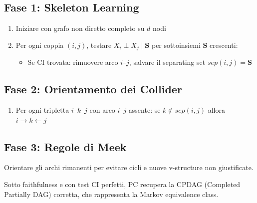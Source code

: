 \subsection{Fase 1: Skeleton Learning}
\begin{enumerate}
    \item Iniziare con grafo non diretto completo su $d$ nodi
    \item Per ogni coppia $(i,j)$, testare $X_i \perp X_j \mid \mathbf{S}$ per sottoinsiemi $\mathbf{S}$ crescenti:
    \begin{itemize}
        \item Se CI trovata: rimuovere arco $i$--$j$, salvare il separating set $sep(i,j) = \mathbf{S}$
    \end{itemize}
\end{enumerate}
\subsection{Fase 2: Orientamento dei Collider}
\begin{enumerate}
    \item Per ogni tripletta $i$--$k$--$j$ con arco $i$--$j$ assente: se $k \notin sep(i,j)$ allora $i \to k \leftarrow j$
\end{enumerate}
\subsection{Fase 3: Regole di Meek}
Orientare gli archi rimanenti per evitare cicli e nuove v-structure non giustificate.

\begin{tcolorbox}[title=Proprietà del PC]
Sotto faithfulness e con test CI perfetti, PC recupera la CPDAG (Completed Partially DAG) corretta, che rappresenta la Markov equivalence class.
\end{tcolorbox}

